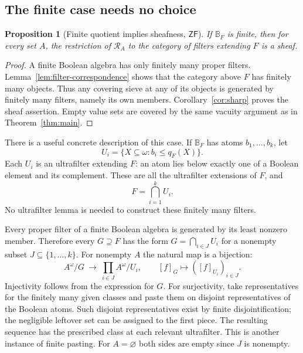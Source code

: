 \documentclass[11pt,letterpaper]{article}
\newtheorem{proposition}[theorem]{Proposition}
\theoremstyle{definition}
\theoremstyle{remark}
\newcommand{\om}{\omega}
\newcommand{\RA}{\mathscr R_A}
\newcommand{\ZF}{\mathsf{ZF}}
\newcommand{\B}{\mathbb B}
\begin{document}
\subsection{The finite case needs no choice}

\begin{proposition}[Finite quotient implies sheafness, $\ZF$]
\label{prop:finiteB}
If $\B_F$ is finite, then for every set $A$, the restriction of
$\RA$ to the category of filters extending $F$ is a sheaf.
\end{proposition}
\begin{proof}
A finite Boolean algebra has only finitely many proper filters.
Lemma~\ref{lem:filter-correspondence} shows that the category above
$F$ has finitely many objects. Thus any covering sieve at any of its
objects is generated by finitely many filters, namely its own members.
Corollary~\ref{cor:sharp} proves the sheaf assertion. Empty value sets
are covered by the same vacuity argument as in Theorem~\ref{thm:main}.
\end{proof}

There is a useful concrete description of this case. If $\B_F$ has
atoms $b_1,\ldots,b_k$, let
\[
 U_i=\{X\subseteq\om:b_i\leq q_F(X)\}.
\]
Each $U_i$ is an ultrafilter extending $F$: an atom lies below exactly
one of a Boolean element and its complement. These are all the
ultrafilter extensions of $F$, and
\begin{equation}\label{eq:finite-intersection}
 F=\bigcap_{i=1}^kU_i.
\end{equation}
No ultrafilter lemma is needed to construct these finitely many filters.

Every proper filter of a finite Boolean algebra is generated by its least
nonzero member. Therefore every $G\supseteq F$ has the form
$G=\bigcap_{i\in J}U_i$ for a nonempty subset $J\subseteq\{1,\ldots,k\}$.
For nonempty $A$ the natural map is a bijection:
\begin{equation}\label{eq:finiteproduct}
 A^\om/G\ \longrightarrow\ \prod_{i\in J} A^\om/U_i,
 \qquad [f]_G\longmapsto([f]_{U_i})_{i\in J}.
\end{equation}
Injectivity follows from the expression for $G$. For surjectivity, take
representatives for the finitely many given classes and paste them on
disjoint representatives of the Boolean atoms. Such disjoint
representatives exist by finite disjointification; the negligible leftover
set can be assigned to the first piece. The resulting sequence has the
prescribed class at each relevant ultrafilter. This is another instance
of finite pasting. For $A=\varnothing$ both sides are empty since
$J$ is nonempty.
\end{document}

